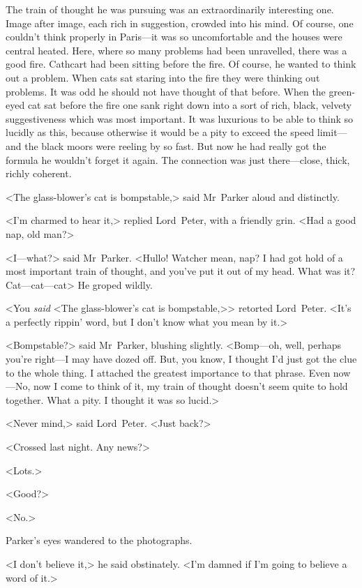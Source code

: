 The train of thought he was pursuing was an extraordinarily interesting one. Image after image, each rich in suggestion, crowded into his mind. Of course, one couldn't think properly in Paris—it was so uncomfortable and the houses were central heated. Here, where so many problems had been unravelled, there was a good fire. Cathcart had been sitting before the fire. Of course, he wanted to think out a problem.  When cats sat staring into the fire they were thinking out problems. It was odd he should not have thought of that before. When the green-eyed cat sat before the fire one sank right down into a sort of rich, black, velvety suggestiveness which was most important. It was luxurious to be able to think so lucidly as this, because otherwise it would be a pity to exceed the speed limit—and the black moors were reeling by so fast.  But now he had really got the formula he wouldn't forget it again. The connection was just there—close, thick, richly coherent.

<The glass-blower's cat is bompstable,> said Mr~Parker aloud and distinctly.

<I'm charmed to hear it,> replied Lord~Peter, with a friendly grin.  <Had a good nap, old man?>

<I—what?> said Mr~Parker. <Hullo! Watcher mean, nap? I had got hold of a most important train of thought, and you've put it out of my head.  What was it? Cat—cat—cat\longdash> He groped wildly.

<You \emph{said} <The glass-blower's cat is bompstable,>> retorted Lord~Peter. <It's a perfectly rippin' word, but I don't know what you mean by it.>

<Bompstable?> said Mr~Parker, blushing slightly. <Bomp—oh, well, perhaps you're right—I may have dozed off. But, you know, I thought I'd just got the clue to the whole thing. I attached the greatest importance to that phrase. Even now—No, now I come to think of it, my train of thought doesn't seem quite to hold together. What a pity. I thought it was so lucid.>

<Never mind,> said Lord~Peter. <Just back?>

<Crossed last night. Any news?>

<Lots.>

<Good?>

<No.>

Parker's eyes wandered to the photographs.

<I don't believe it,> he said obstinately. <I'm damned if I'm going to believe a word of it.>

